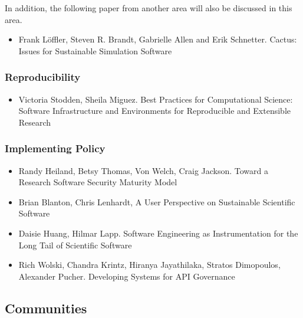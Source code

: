 \documentclass[11pt, oneside]{amsart}
\begin{document}
In addition, the following paper from another area will also be discussed in this area.

\begin{itemize}

\item Frank L\"{o}ffler, Steven R. Brandt, Gabrielle Allen and Erik Schnetter. Cactus: Issues for Sustainable Simulation Software \cite{Loffler_WSSSPE}

\end{itemize}

\subsubsection{Reproducibility}

\begin{itemize}

\item Victoria Stodden, Sheila Miguez. Best Practices for Computational Science: Software Infrastructure and Environments for Reproducible and Extensible Research \cite{Stodden_WSSSPE}

\end{itemize}

\subsubsection{Implementing Policy}

\begin{itemize}

\item Randy Heiland, Betsy Thomas, Von Welch, Craig Jackson. Toward a Research Software Security Maturity Model \cite{Heiland_WSSSPE}

\item Brian Blanton, Chris Lenhardt, A User Perspective on Sustainable Scientific Software \cite{Blanton_WSSSPE}

\item Daisie Huang, Hilmar Lapp. Software Engineering as Instrumentation for the Long Tail of Scientific Software \cite{Huang_WSSSPE}

\item Rich Wolski, Chandra Krintz, Hiranya Jayathilaka, Stratos Dimopoulos, Alexander Pucher. Developing Systems for API Governance \cite{Wolski_WSSSPE}
 
\end{itemize}

\subsection{Communities}
\end{document}
